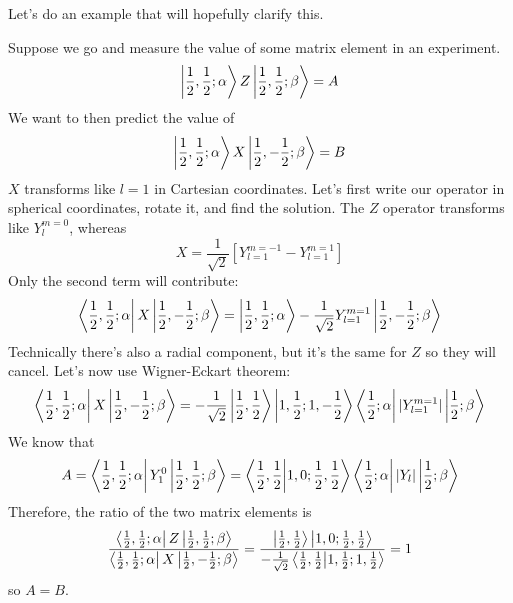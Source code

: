 \documentclass[a4paper,twoside,master.tex]{subfiles}
\begin{document}
Let's do an example that will hopefully clarify this.
\begin{ex}
    Suppose we go and measure the value of some matrix element in an experiment.
    \begin{equation}
        \ket{\frac{1}{2}, \frac{1}{2} ; \alpha} Z\ket{\frac{1}{2}, \frac{1}{2} ; \beta} = A
    \end{equation}
    We want to then predict the value of
    \begin{equation}
        \ket{\frac{1}{2}, \frac{1}{2} ; \alpha} X\ket{\frac{1}{2}, -\frac{1}{2} ; \beta} = B
    \end{equation}
    $ X $ transforms like $ l = 1 $ in Cartesian coordinates. Let's first write our operator in spherical coordinates, rotate it, and find the solution. The $ Z $ operator transforms like $ Y_l^{m=0} $, whereas
    \begin{equation}
        X = \frac{1}{\sqrt{2}} \left[ Y_{l=1}^{m=-1} - Y_{l=1}^{m=1}  \right]
    \end{equation}
    Only the second term will contribute:
    \begin{equation}
        \bra{\frac{1}{2}, \frac{1}{2} ; \alpha} X\ket{\frac{1}{2}, - \frac{1}{2} ; \beta} =\ket{\frac{1}{2}, \frac{1}{2} ; \alpha} - \frac{1}{\sqrt{2}} Y_{l=1}^{m=1}\ket{\frac{1}{2}, - \frac{1}{2} ; \beta}
    \end{equation}
    Technically there's also a radial component, but it's the same for $ Z $ so they will cancel. Let's now use Wigner-Eckart theorem:
    \begin{equation}
        \bra{\frac{1}{2}, \frac{1}{2} ; \alpha} X\ket{\frac{1}{2}, - \frac{1}{2} ; \beta} = - \frac{1}{\sqrt{2}} \ket{\frac{1}{2}, \frac{1}{2}}\ket{1, \frac{1}{2} ; 1, -\frac{1}{2}}\bra{\frac{1}{2}; \alpha}| Y_{l=1}^{m=1}|\ket{\frac{1}{2} ; \beta} 
    \end{equation}
    We know that
    \begin{equation}
        A =\bra{\frac{1}{2}, \frac{1}{2} ; \alpha} Y_1^0\ket{\frac{1}{2}, \frac{1}{2} ; \beta} =\bra{\frac{1}{2}, \frac{1}{2}}\ket{1,0; \frac{1}{2}, \frac{1}{2}}\bra{\frac{1}{2} ; \alpha} |Y_l|\ket{\frac{1}{2}; \beta} 
    \end{equation}
    Therefore, the ratio of the two matrix elements is
    \begin{equation}
        \frac{\bra{\frac{1}{2}, \frac{1}{2}; \alpha} Z\ket{\frac{1}{2}, \frac{1}{2}; \beta}}{\bra{\frac{1}{2}, \frac{1}{2}; \alpha} X\ket{\frac{1}{2}, -\frac{1}{2}; \beta}} = \frac{\ket{\frac{1}{2}, \frac{1}{2}}\ket{1,0; \frac{1}{2}, \frac{1}{2}}}{- \frac{1}{\sqrt{2}}\bra{\frac{1}{2}, \frac{1}{2}}\ket{1, \frac{1}{2} ; 1, \frac{1}{2}}} = 1
    \end{equation}
    so $ A = B $.
\end{ex}
\end{document}
